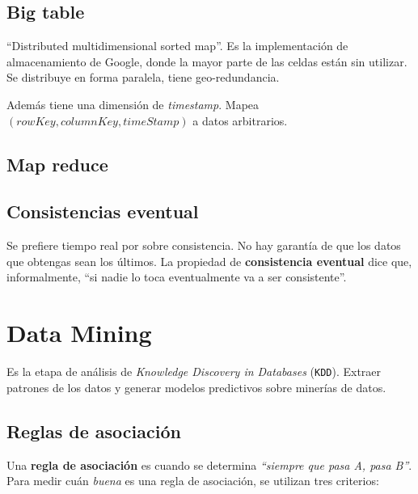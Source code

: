 \documentclass[]{article}
\begin{document}
\subsection{Big table}
``Distributed multidimensional sorted map''.
Es la implementación de almacenamiento de Google, donde la mayor parte de las celdas están sin utilizar. Se distribuye en forma paralela, tiene geo-redundancia.

Además tiene una dimensión de \emph{timestamp}. Mapea $(rowKey, columnKey, timeStamp)$ a datos arbitrarios.


\subsection{Map reduce}
\subsection{Consistencias eventual}
Se prefiere tiempo real por sobre consistencia. No hay garantía de que los datos que obtengas sean los últimos. La propiedad de \textbf{consistencia eventual} dice que, informalmente, ``si nadie lo toca eventualmente va a ser consistente''.



\section{Data Mining}
Es la etapa de análisis de \emph{Knowledge Discovery in Databases} (\texttt{KDD}). Extraer patrones de los datos y generar modelos predictivos sobre minerías de datos.

\subsection{Reglas de asociación}
Una \textbf{regla de asociación} es cuando se determina \emph{``siempre que pasa A, pasa B''}. Para medir cuán \emph{buena} es una regla de asociación, se utilizan tres criterios:
\begin{itemize}
\end{itemize}
\end{document}
